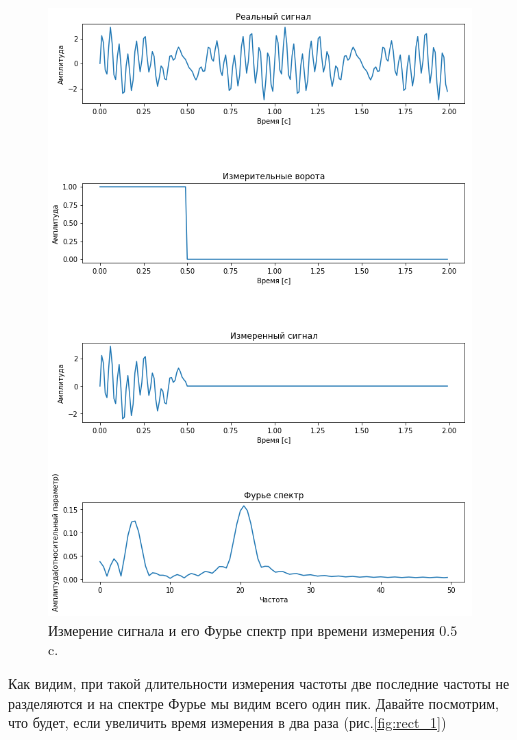 \begin{figure}[!h]
    \centering
    \includegraphics[scale = 0.5]{Pictures/no_separation_rectangular.png}
    \caption{Измерение сигнала и его Фурье спектр при времени измерения $0.5$ c.}
    \label{fig:rect_05}
\end{figure}

Как видим, при такой длительности измерения частоты две последние частоты не разделяются и на спектре Фурье мы видим всего один пик. Давайте посмотрим, что будет, если увеличить время измерения в два раза (рис.\ref{fig:rect_1})

